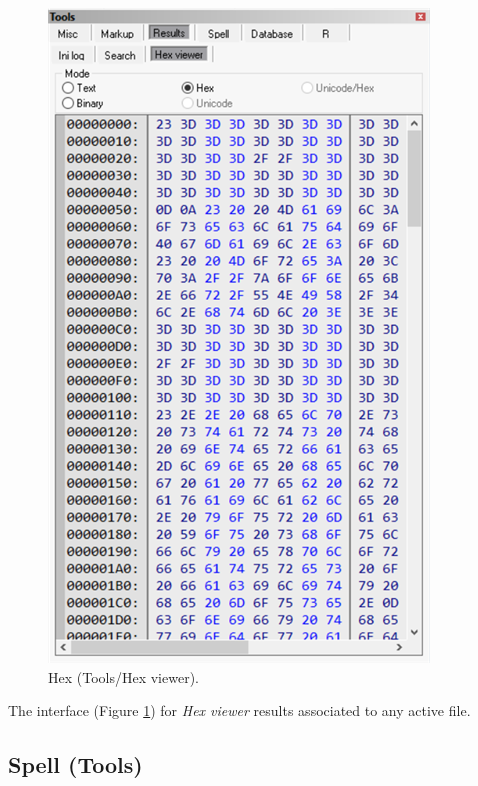 \begin{figure}[H]
  \includegraphics[scale=0.35]{./res/tools_results_hex.png}
  \caption{Hex (Tools/Hex viewer).}
  \label{fig:tools_results_hex}
\end{figure}

The interface
(Figure \ref{fig:tools_results_hex})
for \textit{Hex viewer} results associated to any active file.


\hypertarget{working_tools_spell}{}
\subsection{Spell (Tools)}

